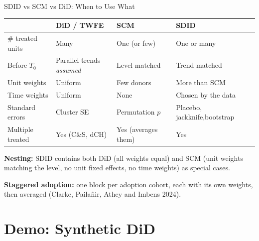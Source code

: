 \documentclass[main.tex]{subfiles}
\begin{document}
\begin{frame}{SDID vs SCM vs DiD: When to Use What}

  \begin{center}
  \small
  \begin{tabular}{p{2.8cm}p{3.2cm}p{3.2cm}p{2.6cm}}
    \toprule
    & \textbf{DiD / TWFE} & \textbf{SCM} & \textbf{SDID} \\
    \midrule
    \# treated units & Many & One (or few) & One or many \\
    Before $T_0$ & Parallel trends \emph{assumed} & Level matched & Trend matched \\
    Unit weights & Uniform & Few donors & More than SCM \\
    Time weights & Uniform & None & Chosen by the data \\
    Standard errors & Cluster SE & Permutation $p$ & Placebo, jackknife,\newline bootstrap \\
    Multiple treated & Yes (C\&S, dCH) & Yes (averages them) & Yes \\
    \bottomrule
  \end{tabular}
  \end{center}

  \medskip
  \textbf{Nesting:} SDID contains both DiD (all weights equal) and SCM (unit
  weights matching the level, no unit fixed effects, no time weights) as
  special cases.

  \smallskip
  \textbf{Staggered adoption:} one block per adoption cohort, each with its
  own weights, then averaged (Clarke, Pailañir, Athey and Imbens 2024).

\end{frame}

\section{Demo: Synthetic DiD}
\end{document}
